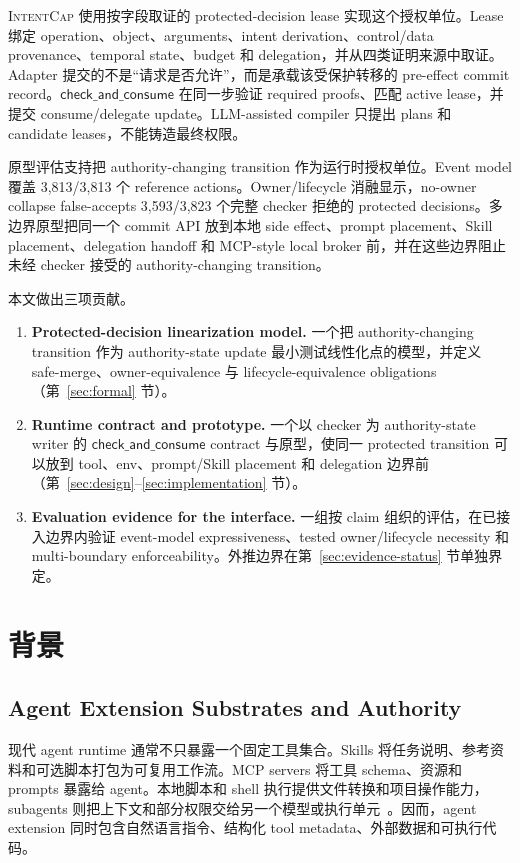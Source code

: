 \documentclass[UTF8,a4paper,11pt]{ctexart}
\newcommand{\sys}{\textsc{IntentCap}\xspace}
\begin{document}
\sys 使用按字段取证的 protected-decision lease 实现这个授权单位。Lease 绑定 operation、object、arguments、intent derivation、control/data provenance、temporal state、budget 和 delegation，并从四类证明来源中取证。Adapter 提交的不是“请求是否允许”，而是承载该受保护转移的 pre-effect commit record。\(\mathsf{check\_and\_consume}\) 在同一步验证 required proofs、匹配 active lease，并提交 consume/delegate update。LLM-assisted compiler 只提出 plans 和 candidate leases，不能铸造最终权限。

原型评估支持把 authority-changing transition 作为运行时授权单位。Event model 覆盖 3,813/3,813 个 reference actions。Owner/lifecycle 消融显示，no-owner collapse false-accepts 3,593/3,823 个完整 checker 拒绝的 protected decisions。多边界原型把同一个 commit API 放到本地 side effect、prompt placement、Skill placement、delegation handoff 和 MCP-style local broker 前，并在这些边界阻止未经 checker 接受的 authority-changing transition。

本文做出三项贡献。
\begin{enumerate}[leftmargin=*,label=\textbf{C\arabic*.}]
  \item \textbf{Protected-decision linearization model.} 一个把 authority-changing transition 作为 authority-state update 最小测试线性化点的模型，并定义 safe-merge、owner-equivalence 与 lifecycle-equivalence obligations（第~\ref{sec:formal} 节）。
  \item \textbf{Runtime contract and prototype.} 一个以 checker 为 authority-state writer 的 \(\mathsf{check\_and\_consume}\) contract 与原型，使同一 protected transition 可以放到 tool、env、prompt/Skill placement 和 delegation 边界前（第~\ref{sec:design}--\ref{sec:implementation} 节）。
  \item \textbf{Evaluation evidence for the interface.} 一组按 claim 组织的评估，在已接入边界内验证 event-model expressiveness、tested owner/lifecycle necessity 和 multi-boundary enforceability。外推边界在第~\ref{sec:evidence-status} 节单独界定。
\end{enumerate}

\section{背景}

\subsection{Agent Extension Substrates and Authority}

现代 agent runtime 通常不只暴露一个固定工具集合。Skills 将任务说明、参考资料和可选脚本打包为可复用工作流。MCP servers 将工具 schema、资源和 prompts 暴露给 agent。本地脚本和 shell 执行提供文件转换和项目操作能力，subagents 则把上下文和部分权限交给另一个模型或执行单元~\cite{skillguard,skillscope,mcp-spec}。因而，agent extension 同时包含自然语言指令、结构化 tool metadata、外部数据和可执行代码。
\end{document}
